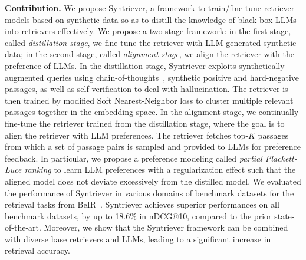 \noindent\textbf{Contribution.} 
We propose Syntriever, a framework to train/fine-tune retriever models based on synthetic data so as to distill the knowledge of black-box LLMs into retrievers effectively. We propose a two-stage framework: in the first stage, called \emph{distillation stage}, we fine-tune the retriever with LLM-generated synthetic data; in the second stage, called \emph{alignment stage}, we align the retriever with the preference of LLMs. 
In the distillation stage, Syntriever exploits synthetically augmented queries using chain-of-thoughts~\cite{wei2022chain}, synthetic positive and hard-negative passages, as well as self-verification to deal with hallucination. The retriever is then trained by modified Soft Nearest-Neighbor loss \cite{frosst2019analyzing} to cluster multiple relevant passages together in the embedding space. In the alignment stage, we continually fine-tune the retriever trained from the distillation stage, where the goal is to align the retriever with  LLM preferences.
The retriever fetches top-$K$ passages from which a set of passage pairs is sampled and provided to LLMs for preference feedback. In particular, we propose a preference modeling called \emph{partial Plackett-Luce ranking} to learn LLM preferences with a regularization effect such that the aligned model does not deviate excessively from the distilled model.
We evaluated the performance of Syntriever in various domains of benchmark datasets for the retrieval tasks from BeIR~\cite{thakur2021beir}. 
Syntriever achieves superior performances on all benchmark datasets, by up to 18.6\% in nDCG@10, compared to the prior state-of-the-art. Moreover, we show that the Syntriever framework can be combined with diverse base retrievers and LLMs, leading to a significant increase in retrieval accuracy. 
